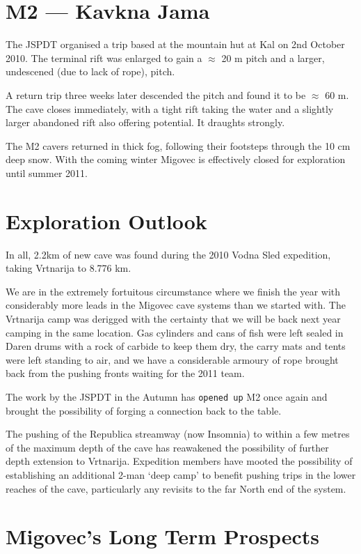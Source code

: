 
\section{M2 --- Kavkna Jama}

The JSPDT organised a trip based at the mountain hut at Kal on 2nd
October 2010. The terminal rift was enlarged to gain a $\approx$ 20 m
pitch and a larger, undescened (due to lack of rope), pitch.

A return trip three weeks later descended the pitch and found it to be
$\approx$ 60 m. The cave closes immediately, with a tight rift taking
the water and a slightly larger abandoned rift also offering potential.
It draughts strongly.

The M2 cavers returned in thick fog, following their footsteps through
the 10 cm deep snow. With the coming winter Migovec is effectively
closed for exploration until summer 2011.

\section{Exploration Outlook}

In all, 2.2km of new cave was found during the 2010 Vodna Sled
expedition, taking Vrtnarija to 8.776 km.

We are in the extremely fortuitous circumstance where we finish the year
with considerably more leads in the Migovec cave systems than we started
with. The Vrtnarija camp was derigged with the certainty that we will be
back next year camping in the same location. Gas cylinders and cans of
fish were left sealed in Daren drums with a rock of carbide to keep them
dry, the carry mats and tents were left standing to air, and we have a
considerable armoury of rope brought back from the pushing fronts
waiting for the 2011 team.

The work by the JSPDT in the Autumn has \texttt{opened up} M2 once again
and brought the possibility of forging a connection back to the table.

The pushing of the Republica streamway (now Insomnia) to within a few
metres of the maximum depth of the cave has reawakened the possibility
of further depth extension to Vrtnarija. Expedition members have mooted
the possibility of establishing an additional 2-man `deep camp' to
benefit pushing trips in the lower reaches of the cave, particularly any
revisits to the far North end of the system.

\section{Migovec's Long Term Prospects}

